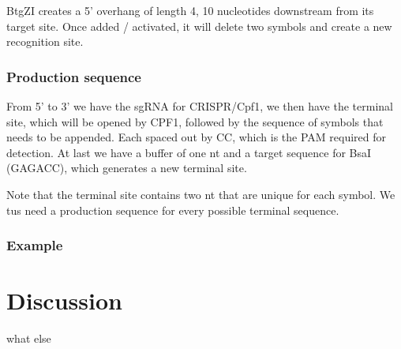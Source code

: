 \documentclass[
11pt, %
a4paper, %
oneside, %
headinclude,footinclude, %
BCOR5mm, %
]{scrartcl}
\begin{document}
BtgZI creates a 5' overhang of length 4, 10 nucleotides downstream from its
target site. Once added / activated, it will delete two symbols and create a new
recognition site.

\subsubsection{Production sequence}

From 5' to 3' we have the sgRNA for CRISPR/Cpf1, we then have the terminal site,
which will be opened by CPF1, followed by the sequence of symbols that needs to
be appended. Each spaced out by CC, which is the PAM required for detection.
At last we have a buffer of one nt and a target sequence for BsaI (GAGACC),
which generates a new terminal site.

Note that the terminal site contains two nt that are unique for each symbol. We
tus need a production sequence for every possible terminal sequence. 

\subsubsection{Example}

\section{Discussion}

what else


\renewcommand{\refname}{\spacedlowsmallcaps{References}} %




\end{document}
